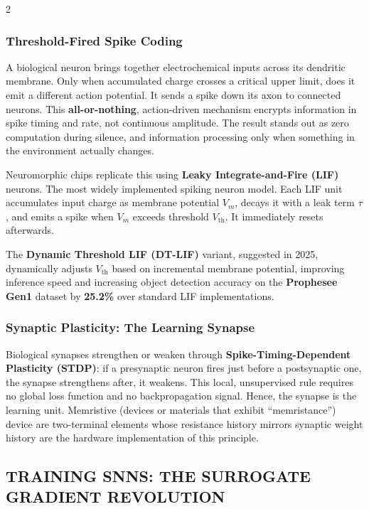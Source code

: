 \begin{multicols}{2}
  \subsubsection*{Threshold-Fired Spike Coding}
  A biological neuron brings together electrochemical inputs across its dendritic membrane. Only when
  accumulated charge crosses a critical upper limit, does it emit a different action potential. It sends a
  spike down its axon to connected neurons. This \textbf{all-or-nothing}, action-driven mechanism encrypts
  information in spike timing and rate, not continuous amplitude. The result stands out as zero
  computation during silence, and information processing only when something in the environment
  actually changes.

  \noindent
  Neuromorphic chips replicate this using \textbf{Leaky Integrate-and-Fire (LIF)} neurons. The most widely
  implemented spiking neuron model. Each LIF unit accumulates input charge as membrane
  potential \(V_m\), decays it with a leak term \(\tau\), and emits a spike when \(V_m\) exceeds threshold \(V_{\mathrm{th}}\). It
  immediately resets afterwards.

  \noindent
  The \textbf{Dynamic Threshold LIF (DT-LIF)} variant, suggested in 2025, dynamically adjusts \(V_{\mathrm{th}}\) based on
  incremental membrane potential, improving inference speed and increasing object detection accuracy
  on the \textbf{Prophesee Gen1} dataset by \textbf{25.2\%} over standard LIF implementations.

  \subsubsection*{Synaptic Plasticity: The Learning Synapse}
  Biological synapses strengthen or weaken through \textbf{Spike-Timing-Dependent Plasticity (STDP)}: if a
  presynaptic neuron fires just before a postsynaptic one, the synapse strengthens after, it weakens. This
  local, unsupervised rule requires no global loss function and no backpropagation signal. Hence, the
  synapse is the learning unit. Memristive (devices or materials that exhibit ``memristance'') device are
  two-terminal elements whose resistance history mirrors synaptic weight history are the hardware
  implementation of this principle.

  \subsection*{\uppercase{Training SNNs: The Surrogate Gradient Revolution}}

\end{multicols}

